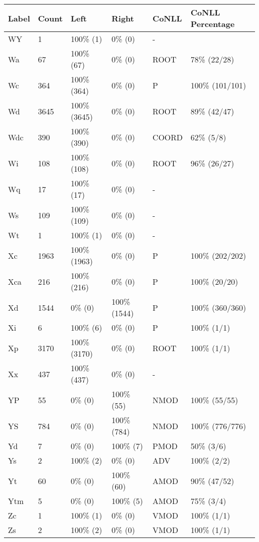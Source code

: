 \begin{figure*}
\begin{tabular}{|l|l|l|l||l|l|}
\hline
Label & Count & Left & Right & CoNLL & CoNLL Percentage\\ 
\hline
 WY & 1 & 100\% (1) & 0\% (0) & - &  \\ 
\hline
 Wa & 67 & 100\% (67) & 0\% (0) & ROOT & 78\% (22/28) \\ 
\hline
 Wc & 364 & 100\% (364) & 0\% (0) & P & 100\% (101/101) \\ 
\hline
 Wd & 3645 & 100\% (3645) & 0\% (0) & ROOT & 89\% (42/47) \\ 
\hline
 Wdc & 390 & 100\% (390) & 0\% (0) & COORD & 62\% (5/8) \\ 
\hline
 Wi & 108 & 100\% (108) & 0\% (0) & ROOT & 96\% (26/27) \\ 
\hline
 Wq & 17 & 100\% (17) & 0\% (0) & - &  \\ 
\hline
 Ws & 109 & 100\% (109) & 0\% (0) & - &  \\ 
\hline
 Wt & 1 & 100\% (1) & 0\% (0) & - &  \\ 
\hline
 Xc & 1963 & 100\% (1963) & 0\% (0) & P & 100\% (202/202) \\ 
\hline
 Xca & 216 & 100\% (216) & 0\% (0) & P & 100\% (20/20) \\ 
\hline
 Xd & 1544 & 0\% (0) & 100\% (1544) & P & 100\% (360/360) \\ 
\hline
 Xi & 6 & 100\% (6) & 0\% (0) & P & 100\% (1/1) \\ 
\hline
 Xp & 3170 & 100\% (3170) & 0\% (0) & ROOT & 100\% (1/1) \\ 
\hline
 Xx & 437 & 100\% (437) & 0\% (0) & - &  \\ 
\hline
 YP & 55 & 0\% (0) & 100\% (55) & NMOD & 100\% (55/55) \\ 
\hline
 YS & 784 & 0\% (0) & 100\% (784) & NMOD & 100\% (776/776) \\ 
\hline
 Yd & 7 & 0\% (0) & 100\% (7) & PMOD & 50\% (3/6) \\ 
\hline
 Ys & 2 & 100\% (2) & 0\% (0) & ADV & 100\% (2/2) \\ 
\hline
 Yt & 60 & 0\% (0) & 100\% (60) & AMOD & 90\% (47/52) \\ 
\hline
 Ytm & 5 & 0\% (0) & 100\% (5) & AMOD & 75\% (3/4) \\ 
\hline
 Zc & 1 & 100\% (1) & 0\% (0) & VMOD & 100\% (1/1) \\ 
\hline
 Zs & 2 & 100\% (2) & 0\% (0) & VMOD & 100\% (1/1) \\ 
\hline
\end{tabular}
\end{figure*}
